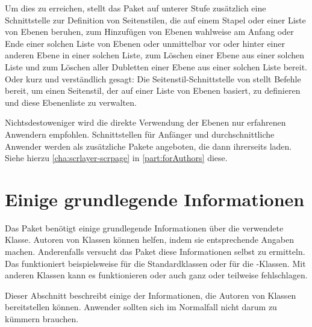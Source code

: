 Um dies zu erreichen, stellt das Paket auf unterer Stufe zusätzlich eine
Schnittstelle zur Definition von Seitenstilen, die auf einem Stapel oder einer
Liste von Ebenen beruhen, zum Hinzufügen von Ebenen wahlweise am Anfang oder
Ende einer solchen Liste von Ebenen oder unmittelbar vor oder hinter einer
anderen Ebene in einer solchen Liste, zum Löschen einer Ebene aus einer
solchen Liste und zum Löschen aller Dubletten einer Ebene aus einer solchen
Liste bereit. Oder kurz und verständlich gesagt: Die Seitenstil-Schnittstelle
von  stellt Befehle bereit, um einen Seitenstil, der auf
einer Liste von Ebenen basiert, zu definieren und diese Ebenenliste zu
verwalten.

Nichtsdestoweniger wird die direkte Verwendung der Ebenen nur erfahrenen
Anwendern empfohlen. Schnittstellen für Anfänger und durchschnittliche
Anwender werden als zusätzliche Pakete angeboten, die dann ihrerseits
 laden. Siehe hierzu \autoref{cha:scrlayer-scrpage} in
\autoref{part:forAuthors} diese.




\section{Einige grundlegende Informationen}

Das Paket benötigt einige grundlegende Informationen über die
verwendete Klasse. Autoren von Klassen können  helfen, indem
sie entsprechende Angaben machen. Anderenfalls versucht das Paket diese
Informationen selbst zu ermitteln. Das funktioniert beispielsweise für die
Standardklassen oder für die \KOMAScript-Klassen. Mit anderen Klassen kann es
funktionieren oder auch ganz oder teilweise fehlschlagen.

Dieser Abschnitt beschreibt einige der Informationen, die Autoren von Klassen
bereitstellen können. Anwender sollten sich im Normalfall nicht darum zu
kümmern brauchen.

